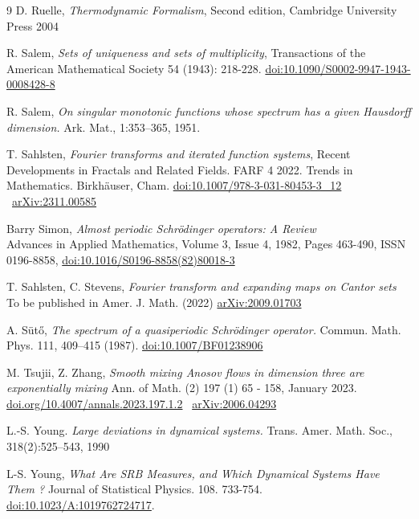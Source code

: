 \documentclass[a4paper]{article}
\theoremstyle{definition}
\begin{document}
\begin{thebibliography}{9}
    {D. Ruelle}, 
    \emph{Thermodynamic Formalism}, 
    Second edition, Cambridge University Press 2004 


    {R. Salem}, \emph{Sets of uniqueness and sets of multiplicity}, 
   Transactions of the American Mathematical Society 54 (1943): 218-228. \href{https://www.semanticscholar.org/paper/Sets-of-uniqueness-and-sets-of-multiplicity-Salem/0737c31586a87737659eb2a547427a118122eaba}{doi:10.1090/S0002-9947-1943-0008428-8}


    {R. Salem}, \emph{On singular monotonic functions whose spectrum has a given Hausdorff dimension.} 
Ark. Mat., 1:353–365, 1951.

    {T. Sahlsten},
    \emph{Fourier transforms and iterated function systems},
      Recent Developments in Fractals and Related Fields. FARF 4 2022. Trends in Mathematics. Birkhäuser, Cham. 
      \href{https://doi.org/10.1007/978-3-031-80453-3_12}{doi:10.1007/978-3-031-80453-3\_12} \
      \href{https://arxiv.org/abs/2311.00585}{arXiv:2311.00585}


    {Barry Simon},
    \emph{Almost periodic Schrödinger operators: A Review} \\
    Advances in Applied Mathematics,
    Volume 3, Issue 4,
    1982,
    Pages 463-490,
    ISSN 0196-8858,
    \href{https://doi.org/10.1016/S0196-8858(82)80018-3}{doi:10.1016/S0196-8858(82)80018-3}

    {T. Sahlsten, C. Stevens},
    \emph{Fourier transform and expanding maps on Cantor sets} \\
    To be published in Amer. J. Math. (2022)
    \href{https://arxiv.org/abs/2009.01703v4}{arXiv:2009.01703 }


    {A. Sütő},
    \emph{The spectrum of a quasiperiodic Schrödinger operator.} 
    Commun. Math. Phys. 111, 409–415 (1987). \href{https://doi.org/10.1007/BF01238906}{doi:10.1007/BF01238906}



    {M. Tsujii, Z. Zhang},
    \emph{Smooth mixing Anosov flows in dimension three are exponentially mixing}
    Ann. of Math. (2) 197 (1) 65 - 158, January 2023. \href{https://doi.org/10.4007/annals.2023.197.1.2}{doi.org/10.4007/annals.2023.197.1.2} \ \href{https://arxiv.org/abs/2006.04293}{arXiv:2006.04293}



    {L.-S. Young.}
    \emph{Large deviations in dynamical systems.}
    Trans. Amer. Math. Soc., 318(2):525–543, 1990

    {L-S. Young},
    \emph{What Are SRB Measures, and Which Dynamical Systems Have Them ?}
     Journal of Statistical Physics. 108. 733-754. 
     \href{http://dx.doi.org/10.1023/A:1019762724717}{doi:10.1023/A:1019762724717}.




\end{thebibliography}
\end{document}

